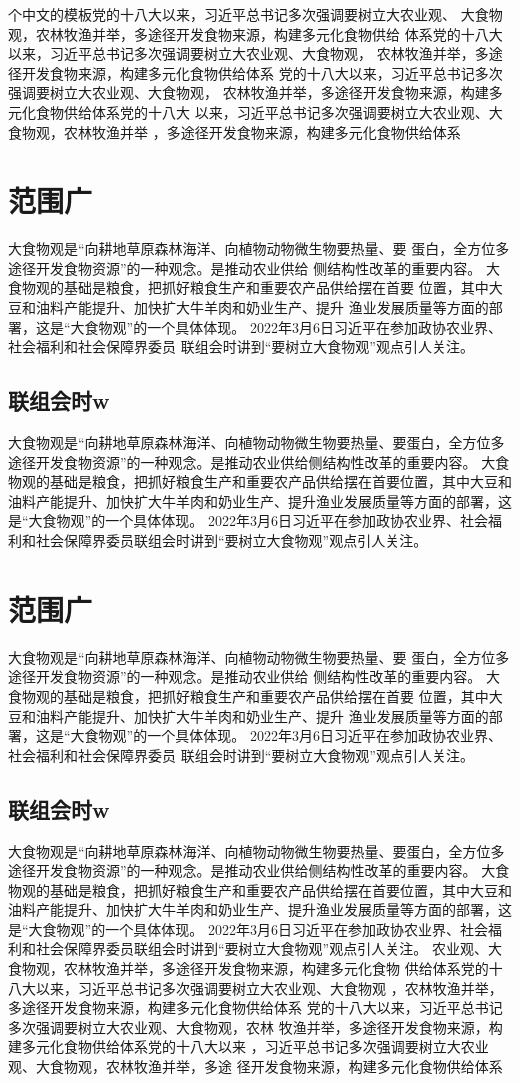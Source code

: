 个中文的模板党的十八大以来，习近平总书记多次强调要树立大农业观、
大食物观，农林牧渔并举，多途径开发食物来源，构建多元化食物供给
体系党的十八大以来，习近平总书记多次强调要树立大农业观、大食物观，
农林牧渔并举，多途径开发食物来源，构建多元化食物供给体系
党的十八大以来，习近平总书记多次强调要树立大农业观、大食物观，
农林牧渔并举，多途径开发食物来源，构建多元化食物供给体系党的十八大
以来，习近平总书记多次强调要树立大农业观、大食物观，农林牧渔并举
，多途径开发食物来源，构建多元化食物供给体系
	\section{范围广}
	大食物观是“向耕地草原森林海洋、向植物动物微生物要热量、要
	蛋白，全方位多途径开发食物资源”的一种观念。是推动农业供给
	侧结构性改革的重要内容。
大食物观的基础是粮食，把抓好粮食生产和重要农产品供给摆在首要
位置，其中大豆和油料产能提升、加快扩大牛羊肉和奶业生产、提升
渔业发展质量等方面的部署，这是“大食物观”的一个具体体现。
2022年3月6日习近平在参加政协农业界、社会福利和社会保障界委员
联组会时讲到“要树立大食物观”观点引人关注。
\subsection{联组会时w}
大食物观是“向耕地草原森林海洋、向植物动物微生物要热量、要蛋白，全方位多途径开发食物资源”的一种观念。是推动农业供给侧结构性改革的重要内容。
大食物观的基础是粮食，把抓好粮食生产和重要农产品供给摆在首要位置，其中大豆和油料产能提升、加快扩大牛羊肉和奶业生产、提升渔业发展质量等方面的部署，这是“大食物观”的一个具体体现。
2022年3月6日习近平在参加政协农业界、社会福利和社会保障界委员联组会时讲到“要树立大食物观”观点引人关注。
\section{范围广}
大食物观是“向耕地草原森林海洋、向植物动物微生物要热量、要
蛋白，全方位多途径开发食物资源”的一种观念。是推动农业供给
侧结构性改革的重要内容。
大食物观的基础是粮食，把抓好粮食生产和重要农产品供给摆在首要
位置，其中大豆和油料产能提升、加快扩大牛羊肉和奶业生产、提升
渔业发展质量等方面的部署，这是“大食物观”的一个具体体现。
2022年3月6日习近平在参加政协农业界、社会福利和社会保障界委员
联组会时讲到“要树立大食物观”观点引人关注。
\subsection{联组会时w}
大食物观是“向耕地草原森林海洋、向植物动物微生物要热量、要蛋白，全方位多途径开发食物资源”的一种观念。是推动农业供给侧结构性改革的重要内容。
大食物观的基础是粮食，把抓好粮食生产和重要农产品供给摆在首要位置，其中大豆和油料产能提升、加快扩大牛羊肉和奶业生产、提升渔业发展质量等方面的部署，这是“大食物观”的一个具体体现。
2022年3月6日习近平在参加政协农业界、社会福利和社会保障界委员联组会时讲到“要树立大食物观”观点引人关注。
农业观、大食物观，农林牧渔并举，多途径开发食物来源，构建多元化食物
供给体系党的十八大以来，习近平总书记多次强调要树立大农业观、大食物观
，农林牧渔并举，多途径开发食物来源，构建多元化食物供给体系
党的十八大以来，习近平总书记多次强调要树立大农业观、大食物观，农林
牧渔并举，多途径开发食物来源，构建多元化食物供给体系党的十八大以来
，习近平总书记多次强调要树立大农业观、大食物观，农林牧渔并举，多途
径开发食物来源，构建多元化食物供给体系	

